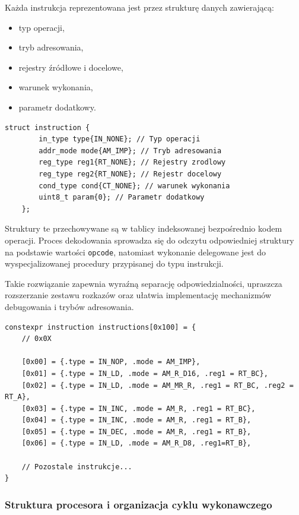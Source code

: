\documentclass{article}
\begin{document}
Każda instrukcja reprezentowana jest przez strukturę danych zawierającą:
\begin{itemize}
	\item typ operacji,
	\item tryb adresowania,
	\item rejestry źródłowe i docelowe,
	\item warunek wykonania,
	\item parametr dodatkowy.
\end{itemize}

\begin{lstlisting}[style=cpp, caption={Struktura instrukcji}]
	struct instruction {
		in_type type{IN_NONE}; // Typ operacji
		addr_mode mode{AM_IMP}; // Tryb adresowania
		reg_type reg1{RT_NONE}; // Rejestry zrodlowy
		reg_type reg2{RT_NONE}; // Rejestr docelowy
		cond_type cond{CT_NONE}; // warunek wykonania
		uint8_t param{0}; // Parametr dodatkowy
	};
\end{lstlisting}



Struktury te przechowywane są w tablicy indeksowanej bezpośrednio kodem operacji. Proces dekodowania sprowadza się do odczytu odpowiedniej struktury na podstawie wartości \texttt{opcode}, natomiast wykonanie delegowane jest do wyspecjalizowanej procedury przypisanej do typu instrukcji.

Takie rozwiązanie zapewnia wyraźną separację odpowiedzialności, upraszcza rozszerzanie zestawu rozkazów oraz ułatwia implementację mechanizmów debugowania i trybów adresowania.


\begin{lstlisting}[style=cpp, caption={Fragment tablicy instrukcji indeksowanej kodem operacji}]
constexpr instruction instructions[0x100] = {
	// 0x0X
	
	[0x00] = {.type = IN_NOP, .mode = AM_IMP},
	[0x01] = {.type = IN_LD, .mode = AM_R_D16, .reg1 = RT_BC},
	[0x02] = {.type = IN_LD, .mode = AM_MR_R, .reg1 = RT_BC, .reg2 = RT_A},
	[0x03] = {.type = IN_INC, .mode = AM_R, .reg1 = RT_BC},
	[0x04] = {.type = IN_INC, .mode = AM_R, .reg1 = RT_B},
	[0x05] = {.type = IN_DEC, .mode = AM_R, .reg1 = RT_B},
	[0x06] = {.type = IN_LD, .mode = AM_R_D8, .reg1=RT_B},
	
	// Pozostale instrukcje...
}
\end{lstlisting}

\subsubsection{Struktura procesora i organizacja cyklu wykonawczego}
\end{document}
